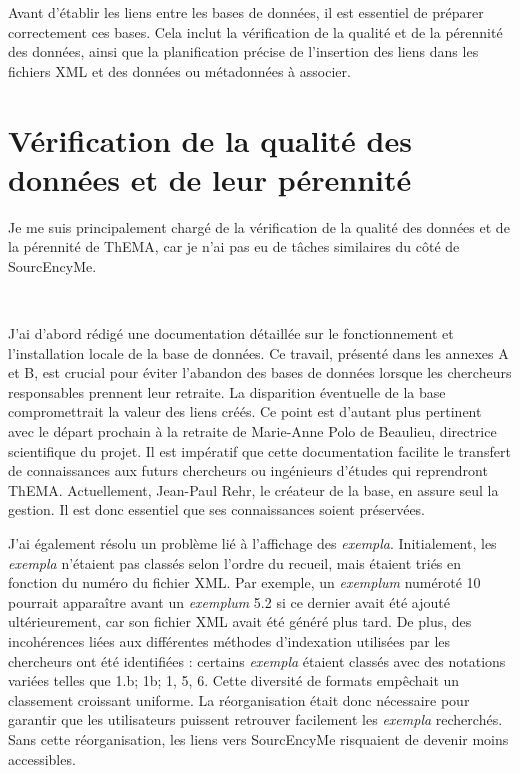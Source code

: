 Avant d'établir les liens entre les bases de données, il est essentiel de préparer correctement ces bases. Cela inclut la vérification de la qualité et de la pérennité des données, ainsi que la planification précise de l'insertion des liens dans les fichiers XML et des données ou métadonnées à associer.


\section{Vérification de la qualité des données et de leur pérennité}
Je me suis principalement chargé de la vérification de la qualité des données et de la pérennité de ThEMA, car je n'ai pas eu de tâches similaires du côté de SourcEncyMe.

\

J'ai d'abord rédigé une documentation détaillée sur le fonctionnement et l'installation locale de la base de données. Ce travail, présenté dans les annexes A et B, est crucial pour éviter l'abandon des bases de données lorsque les chercheurs responsables prennent leur retraite. La disparition éventuelle de la base compromettrait la valeur des liens créés. Ce point est d'autant plus pertinent avec le départ prochain à la retraite de Marie-Anne Polo de Beaulieu, directrice scientifique du projet. Il est impératif que cette documentation facilite le transfert de connaissances aux futurs chercheurs ou ingénieurs d'études qui reprendront ThEMA. Actuellement, Jean-Paul Rehr, le créateur de la base, en assure seul la gestion. Il est donc essentiel que ses connaissances soient préservées.

J'ai également résolu un problème lié à l'affichage des \textit{exempla}. Initialement, les \textit{exempla} n'étaient pas classés selon l'ordre du recueil, mais étaient triés en fonction du numéro du fichier XML. Par exemple, un \textit{exemplum} numéroté 10 pourrait apparaître avant un \textit{exemplum} 5.2 si ce dernier avait été ajouté ultérieurement, car son fichier XML avait été généré plus tard. De plus, des incohérences liées aux différentes méthodes d'indexation utilisées par les chercheurs ont été identifiées : certains \textit{exempla} étaient classés avec des notations variées telles que 1.b; 1b; 1, 5, 6. Cette diversité de formats empêchait un classement croissant uniforme. La réorganisation était donc nécessaire pour garantir que les utilisateurs puissent retrouver facilement les \textit{exempla} recherchés. Sans cette réorganisation, les liens vers SourcEncyMe risquaient de devenir moins accessibles. \\

